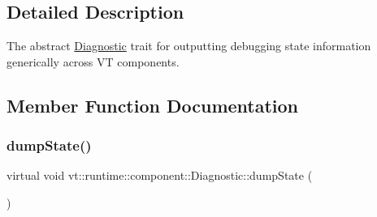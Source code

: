 \subsection{Detailed Description}
The abstract {\ttfamily \hyperlink{structvt_1_1runtime_1_1component_1_1_diagnostic}{Diagnostic}} trait for outputting debugging state information generically across VT components. 

\subsection{Member Function Documentation}
\mbox{\label{structvt_1_1runtime_1_1component_1_1_diagnostic_a1b6da987a14917c7ee8a4d00138e62e6}} 
\subsubsection{\texorpdfstring{dump\+State()}{dumpState()}}
{\footnotesize\ttfamily virtual void vt\+::runtime\+::component\+::\+Diagnostic\+::dump\+State (\begin{DoxyParamCaption}{ }\end{DoxyParamCaption})\hspace{0.3cm}{\ttfamily [pure virtual]}}



